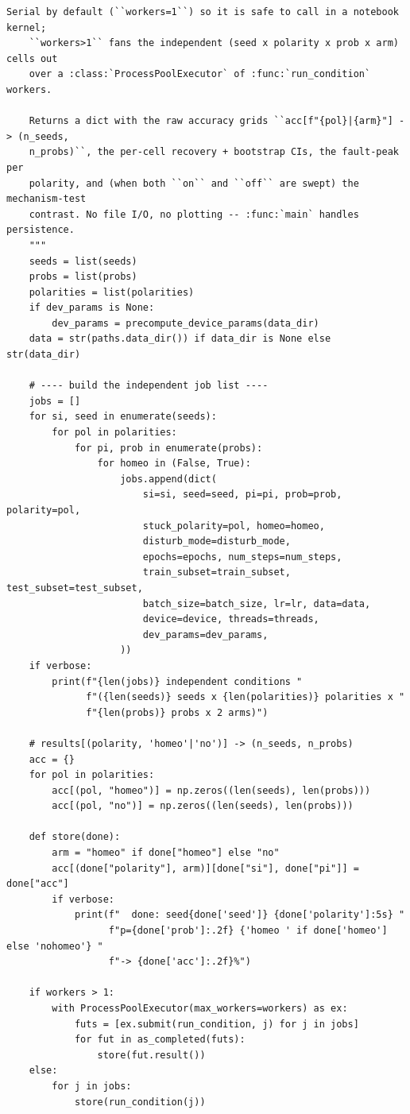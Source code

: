 \begin{lstlisting}[caption={mnn\_torch/training.py},label={lst:mnn-src-training}]
    Serial by default (``workers=1``) so it is safe to call in a notebook kernel;
    ``workers>1`` fans the independent (seed x polarity x prob x arm) cells out
    over a :class:`ProcessPoolExecutor` of :func:`run_condition` workers.

    Returns a dict with the raw accuracy grids ``acc[f"{pol}|{arm}"] -> (n_seeds,
    n_probs)``, the per-cell recovery + bootstrap CIs, the fault-peak per
    polarity, and (when both ``on`` and ``off`` are swept) the mechanism-test
    contrast. No file I/O, no plotting -- :func:`main` handles persistence.
    """
    seeds = list(seeds)
    probs = list(probs)
    polarities = list(polarities)
    if dev_params is None:
        dev_params = precompute_device_params(data_dir)
    data = str(paths.data_dir()) if data_dir is None else str(data_dir)

    # ---- build the independent job list ----
    jobs = []
    for si, seed in enumerate(seeds):
        for pol in polarities:
            for pi, prob in enumerate(probs):
                for homeo in (False, True):
                    jobs.append(dict(
                        si=si, seed=seed, pi=pi, prob=prob, polarity=pol,
                        stuck_polarity=pol, homeo=homeo,
                        disturb_mode=disturb_mode,
                        epochs=epochs, num_steps=num_steps,
                        train_subset=train_subset, test_subset=test_subset,
                        batch_size=batch_size, lr=lr, data=data,
                        device=device, threads=threads,
                        dev_params=dev_params,
                    ))
    if verbose:
        print(f"{len(jobs)} independent conditions "
              f"({len(seeds)} seeds x {len(polarities)} polarities x "
              f"{len(probs)} probs x 2 arms)")

    # results[(polarity, 'homeo'|'no')] -> (n_seeds, n_probs)
    acc = {}
    for pol in polarities:
        acc[(pol, "homeo")] = np.zeros((len(seeds), len(probs)))
        acc[(pol, "no")] = np.zeros((len(seeds), len(probs)))

    def store(done):
        arm = "homeo" if done["homeo"] else "no"
        acc[(done["polarity"], arm)][done["si"], done["pi"]] = done["acc"]
        if verbose:
            print(f"  done: seed{done['seed']} {done['polarity']:5s} "
                  f"p={done['prob']:.2f} {'homeo ' if done['homeo'] else 'nohomeo'} "
                  f"-> {done['acc']:.2f}%")

    if workers > 1:
        with ProcessPoolExecutor(max_workers=workers) as ex:
            futs = [ex.submit(run_condition, j) for j in jobs]
            for fut in as_completed(futs):
                store(fut.result())
    else:
        for j in jobs:
            store(run_condition(j))


\end{lstlisting}
